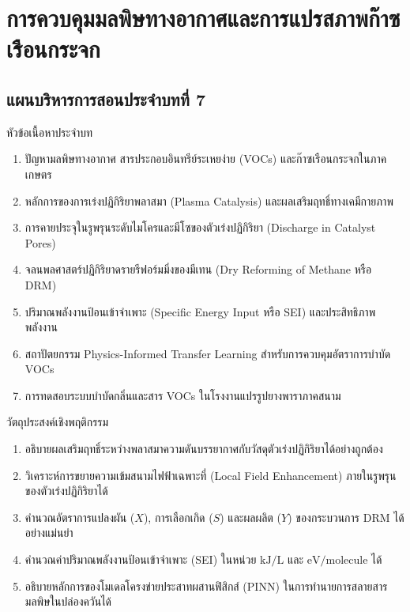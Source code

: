 \chapter{การควบคุมมลพิษทางอากาศและการแปรสภาพก๊าซเรือนกระจก}
\label{chap:ch07}


\vspace*{-6pt}
\section*{แผนบริหารการสอนประจำบทที่ 7}

\begin{planbox}{หัวข้อเนื้อหาประจำบท}
\begin{enumerate}
    \item ปัญหามลพิษทางอากาศ สารประกอบอินทรีย์ระเหยง่าย (VOCs) และก๊าซเรือนกระจกในภาคเกษตร
    \item หลักการของการเร่งปฏิกิริยาพลาสมา (Plasma Catalysis) และผลเสริมฤทธิ์ทางเคมีกายภาพ
    \item การคายประจุในรูพรุนระดับไมโครและมีโซของตัวเร่งปฏิกิริยา (Discharge in Catalyst Pores)
    \item จลนพลศาสตร์ปฏิกิริยาดรายรีฟอร์มมิ่งของมีเทน (Dry Reforming of Methane หรือ DRM)
    \item ปริมาณพลังงานป้อนเข้าจำเพาะ (Specific Energy Input หรือ SEI) และประสิทธิภาพพลังงาน
    \item สถาปัตยกรรม Physics-Informed Transfer Learning สำหรับการควบคุมอัตราการบำบัด VOCs
    \item การทดสอบระบบบำบัดกลิ่นและสาร VOCs ในโรงงานแปรรูปยางพาราภาคสนาม
\end{enumerate}
\end{planbox}

\begin{planbox}{วัตถุประสงค์เชิงพฤติกรรม}
\begin{enumerate}
    \item อธิบายผลเสริมฤทธิ์ระหว่างพลาสมาความดันบรรยากาศกับวัสดุตัวเร่งปฏิกิริยาได้อย่างถูกต้อง
    \item วิเคราะห์การขยายความเข้มสนามไฟฟ้าเฉพาะที่ (Local Field Enhancement) ภายในรูพรุนของตัวเร่งปฏิกิริยาได้
    \item คำนวณอัตราการแปลงผัน ($X$), การเลือกเกิด ($S$) และผลผลิต ($Y$) ของกระบวนการ DRM ได้อย่างแม่นยำ
    \item คำนวณค่าปริมาณพลังงานป้อนเข้าจำเพาะ (SEI) ในหน่วย $\text{kJ/L}$ และ $\text{eV/molecule}$ ได้
    \item อธิบายหลักการของโมเดลโครงข่ายประสาทผสานฟิสิกส์ (PINN) ในการทำนายการสลายสารมลพิษในปล่องควันได้
\end{enumerate}
\end{planbox}

